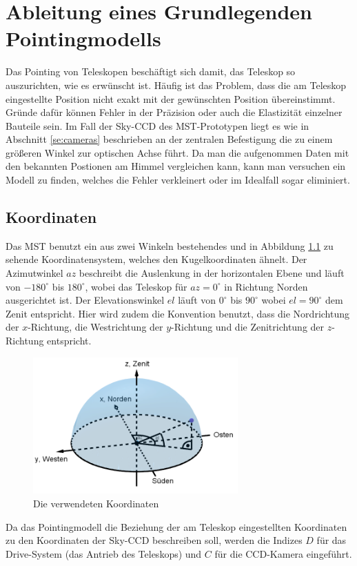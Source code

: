 \chapter{Ableitung eines Grundlegenden Pointingmodells}
\label{ch:pointing}
Das Pointing von Teleskopen beschäftigt sich damit, das Teleskop so auszurichten, wie es erwünscht ist. Häufig ist das Problem, dass die am Teleskop eingestellte Position nicht exakt mit der gewünschten Position übereinstimmt. Gründe dafür können Fehler in der Präzision oder auch die Elastizität einzelner Bauteile sein. Im Fall der Sky-CCD des MST-Prototypen liegt es wie in Abschnitt \ref{se:cameras} beschrieben an der zentralen Befestigung die zu einem größeren Winkel zur optischen Achse führt. Da man die aufgenommen Daten mit den bekannten Postionen am Himmel vergleichen kann, kann man versuchen ein Modell zu finden, welches die Fehler verkleinert oder im Idealfall sogar eliminiert.

\section{Koordinaten}
Das MST benutzt ein aus zwei Winkeln bestehendes und in Abbildung \ref{img:coordinates} zu sehende Koordinatensystem, welches den Kugelkoordinaten ähnelt. Der Azimutwinkel $az$ beschreibt die Auslenkung in der horizontalen Ebene und läuft von $-180^{\circ}$ bis $180^{\circ}$, wobei das Teleskop für $az=0^{\circ}$ in Richtung Norden ausgerichtet ist. Der Elevationswinkel $el$ läuft von $0^{\circ}$ bis $90^{\circ}$ wobei $el=90^{\circ}$ dem Zenit entspricht. Hier wird zudem die Konvention benutzt, dass die Nordrichtung der $x$-Richtung, die Westrichtung der $y$-Richtung und die Zenitrichtung der $z$-Richtung entspricht.
\begin{figure}[htbp]
\centering
\includegraphics[width=0.7\textwidth]{Images/coordinates.png}
\caption{Die verwendeten Koordinaten}
\label{img:coordinates}
\end{figure}
Da das Pointingmodell die Beziehung der am Teleskop eingestellten Koordinaten zu den Koordinaten der Sky-CCD beschreiben soll, werden die Indizes $D$ für das Drive-System (das Antrieb des Teleskops) und $C$ für die CCD-Kamera eingeführt.

